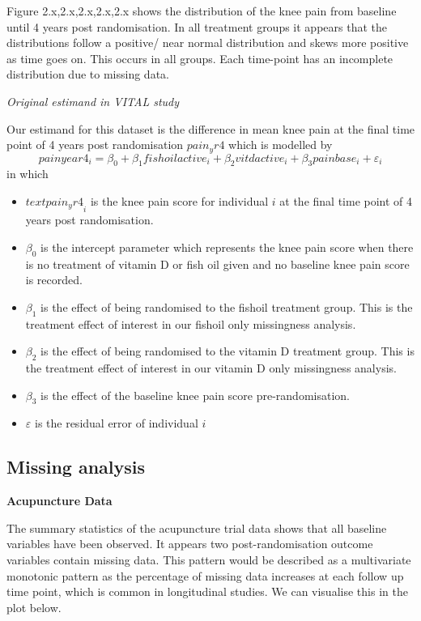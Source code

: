 \documentclass{article}
\providecommand{\tightlist}{%
  \setlength{\itemsep}{0pt}\setlength{\parskip}{0pt}}
\begin{document}
Figure 2.x,2.x,2.x,2.x,2.x shows the distribution of the knee pain from
baseline until 4 years post randomisation. In all treatment groups it
appears that the distributions follow a positive/ near normal
distribution and skews more positive as time goes on. This occurs in all
groups. Each time-point has an incomplete distribution due to missing
data.

\emph{Original estimand in VITAL study}

Our estimand for this dataset is the difference in mean knee pain at the
final time point of 4 years post randomisation \(pain_yr4\) which is
modelled by
\[painyear4_i = \beta_0 + \beta_1 fishoilactive_i + \beta_2 vitdactive_i + \beta_3 painbase_i + \varepsilon_i\]
in which

\begin{itemize}
\tightlist
\item
  \(text{pain_yr4}_i\) is the knee pain score for individual \(i\) at
  the final time point of 4 years post randomisation.
\item
  \(\beta_0\) is the intercept parameter which represents the knee pain
  score when there is no treatment of vitamin D or fish oil given and no
  baseline knee pain score is recorded.
\item
  \(\beta_1\) is the effect of being randomised to the fishoil treatment
  group. This is the treatment effect of interest in our fishoil only
  missingness analysis.
\item
  \(\beta_2\) is the effect of being randomised to the vitamin D
  treatment group. This is the treatment effect of interest in our
  vitamin D only missingness analysis.
\item
  \(\beta_3\) is the effect of the baseline knee pain score
  pre-randomisation.
\item
  \(\varepsilon\) is the residual error of individual \(i\)
\end{itemize}

\newpage

\subsection{Missing analysis}\label{missing-analysis}

\textbf{Acupuncture Data}

The summary statistics of the acupuncture trial data shows that all
baseline variables have been observed. It appears two post-randomisation
outcome variables contain missing data. This pattern would be described
as a multivariate monotonic pattern as the percentage of missing data
increases at each follow up time point, which is common in longitudinal
studies. We can visualise this in the plot below.
\end{document}
